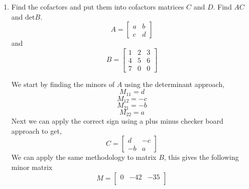 \begin{enumerate}[label=\arabic*.]
    \item Find the cofactors and put them into cofactors matrices $C$ and
        $D$. Find $AC$ and $\text{det}B$.
        \begin{equation}
          A = 
          \begin{bmatrix}
            a & b \\
            c & d
           \end{bmatrix}
        \end{equation}
        and 
        \begin{equation}
            B = 
            \begin{bmatrix}
                1 & 2 & 3 \\
                4 & 5 & 6 \\
                7 & 0 & 0
            \end{bmatrix}
        \end{equation}
        \begin{mdframed}[style=MyFrame]
            We start by finding the minors of $A$ using the determinant
            approach,
            \begin{equation}
                M_{11} = d
            \end{equation}
            \begin{equation}
                M_{12} = -c
            \end{equation}
            \begin{equation}
                M_{21} =  -b
            \end{equation}
            \begin{equation}
                M_{22} = a
            \end{equation}
            Next we can apply the correct sign using a plus minus checker
            board approach to get,
            \begin{equation}
                C = 
                \begin{bmatrix}
                    d       &       -c  \\
                    -b      &       a
                \end{bmatrix}
            \end{equation}
            We can apply the same methodology to matrix $B$, this gives the
            following minor matrix
            \begin{equation}
                M = 
                \begin{bmatrix}
                    0   &   -42     &       -35     \\

\end{bmatrix}
\end{equation}
\end{mdframed}
\end{enumerate}
